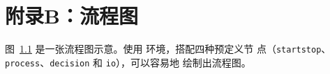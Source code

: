 
\chapter{附录B：流程图}

图~\ref{fig:flow_chart} 是一张流程图示意。使用  环境，搭配四种预定义节
点（\verb|startstop|、\verb|process|、\verb|decision| 和 \verb|io|），可以容易地
绘制出流程图。

\begin{figure}[!htp]
  \centering
  
  \label{fig:flow_chart}
\end{figure}
